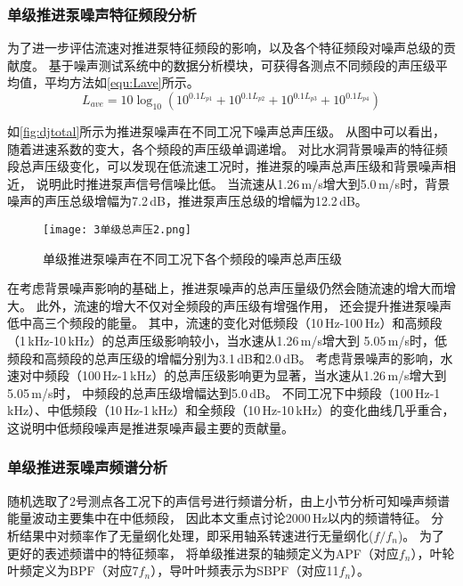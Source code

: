 \subsubsection{单级推进泵噪声特征频段分析}
为了进一步评估流速对推进泵特征频段的影响，以及各个特征频段对噪声总级的贡献度。
基于噪声测试系统中的数据分析模块，可获得各测点不同频段的声压级平均值，平均方法如\autoref{equ:Lave}所示。
\begin{equation}
    \label{equ:Lave}
    L_{ave}=10\log_{10}\left ( {10^{0.1L_{p1}}}+{10^{0.1L_{p2}}}+{10^{0.1L_{p3}}}+{10^{0.1L_{p4}}}  \right ) 
\end{equation}

如\autoref{fig:djtotal}所示为推进泵噪声在不同工况下噪声总声压级。
从图中可以看出，随着进速系数的变大，各个频段的声压级单调递增。
对比水洞背景噪声的特征频段总声压级变化，可以发现在低流速工况时，推进泵的噪声总声压级和背景噪声相近，
说明此时推进泵声信号信噪比低。
当流速从1.26\,m/s增大到5.0\,m/s时，背景噪声的声压总级增幅为7.2\,dB，推进泵声压总级的增幅为12.2\,dB。
\begin{figure}[htbp]
    \centering
    \texttt{[image: 3单级总声压2.png]}
    \caption{\label{fig:djtotal}单级推进泵噪声在不同工况下各个频段的噪声总声压级}
\end{figure}

在考虑背景噪声影响的基础上，推进泵噪声的总声压量级仍然会随流速的增大而增大。
此外，流速的增大不仅对全频段的声压级有增强作用，
还会提升推进泵噪声低中高三个频段的能量。
其中，流速的变化对低频段（10\,Hz-100\,Hz）和高频段（1\,kHz-10\,kHz）的总声压级影响较小，当水速从1.26\,m/s增大到
5.05\,m/s时，低频段和高频段的总声压级的增幅分别为3.1\,dB和2.0\,dB。
考虑背景噪声的影响，水速对中频段（100\,Hz-1\,kHz）的总声压级影响更为显著，当水速从1.26\,m/s增大到5.05\,m/s时，
中频段的总声压级增幅达到5.0\,dB。
不同工况下中频段（100\,Hz-1\,kHz）、中低频段（10\,Hz-1\,kHz）和全频段（10\,Hz-10\,kHz）的变化曲线几乎重合，
这说明中低频段噪声是推进泵噪声最主要的贡献量。
\subsubsection{单级推进泵噪声频谱分析}
随机选取了2号测点各工况下的声信号进行频谱分析，由上小节分析可知噪声频谱能量波动主要集中在中低频段，
因此本文重点讨论2000\,Hz以内的频谱特征。
分析结果中对频率作了无量纲化处理，即采用轴系转速进行无量纲化($f/f_n$)。
为了更好的表述频谱中的特征频率，
将单级推进泵的轴频定义为APF（对应$f_n$），叶轮叶频定义为BPF（对应7$f_n$），导叶叶频表示为SBPF（对应11$f_n$）。

